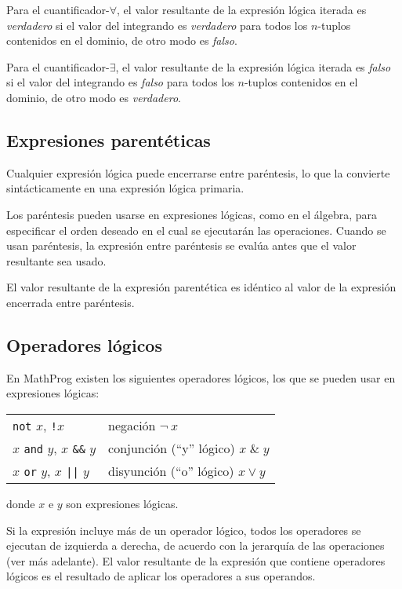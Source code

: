 \documentclass[11pt,spanish]{report}
\begin{document}
Para el cuantificador-$\forall$, el valor resultante de la expresión lógica iterada es {\it verdadero} si el valor del integrando es {\it verdadero} para todos los $n$-tuplos contenidos en el dominio, de otro modo es {\it falso}.

Para el cuantificador-$\exists$, el valor resultante de la expresión lógica iterada es {\it falso} si el valor del integrando es {\it falso} para todos los $n$-tuplos contenidos en el dominio, de otro modo es {\it verdadero}.

\subsection{Expresiones parentéticas}

Cualquier expresión lógica puede encerrarse entre paréntesis, lo que la convierte sintácticamente en una expresión lógica primaria.

Los paréntesis pueden usarse en expresiones lógicas, como en el álgebra, para especificar el orden deseado en el cual se ejecutarán las operaciones. Cuando se usan paréntesis, la expresión entre paréntesis se evalúa antes que el valor resultante sea usado.

El valor resultante de la expresión parentética es idéntico al valor de la expresión encerrada entre paréntesis.

\subsection{Operadores lógicos}

En MathProg existen los siguientes operadores lógicos, los que se pueden usar en expresiones lógicas:

\begin{tabular}{@{}ll@{}}
{\tt not} $x$, {\tt!}$x$&negación $\neg\ x$\\
$x$ {\tt and} $y$, $x$ {\tt\&\&} $y$&conjunción (``y'' lógico)
$x\;\&\;y$\\
$x$ {\tt or} $y$, $x$ {\tt||} $y$&disyunción (``o'' lógico)
$x\vee y$\\
\end{tabular}

\noindent donde $x$ e $y$ son expresiones lógicas.

Si la expresión incluye más de un operador lógico, todos los operadores se ejecutan de izquierda a derecha, de acuerdo con la jerarquía de las operaciones (ver más adelante). El valor resultante de la expresión que contiene operadores lógicos es el resultado de aplicar los operadores a sus operandos.
\end{document}
